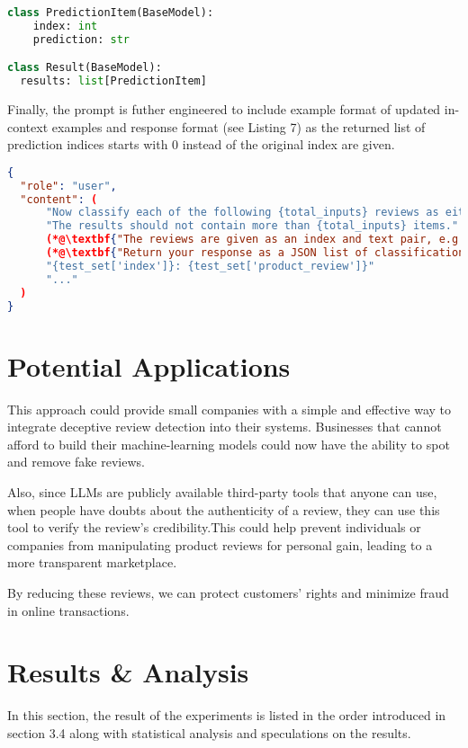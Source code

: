 \documentclass[sigconf, nonacm]{acmart}
\theoremstyle{definition}
\begin{document}
\begin{lstlisting}[language=Python, caption={Final Response Format}]
class PredictionItem(BaseModel):
    index: int
    prediction: str

class Result(BaseModel):
  results: list[PredictionItem]
\end{lstlisting}

Finally, the prompt is futher engineered to include example format of updated in-context examples and response format (see Listing 7) as the returned list of prediction indices starts with 0 instead of the original index are given.

\begin{lstlisting}[language=json, caption={Final User Messages}]
{
  "role": "user",
  "content": (
      "Now classify each of the following {total_inputs} reviews as either 'truthful' or 'deceptive'. "
      "The results should not contain more than {total_inputs} items."
      (*@\textbf{"The reviews are given as an index and text pair, e.g. '123: This is a review.'"}@*)
      (*@\textbf{"Return your response as a JSON list of classifications paired with an index, e.g. [{'123': 'truthful'}, {'456': 'deceptive'}, ...]."}@*)
      "{test_set['index']}: {test_set['product_review']}"
      "..."
  )
}
\end{lstlisting}

\section{Potential Applications}

This approach could provide small companies with a simple and effective way to integrate deceptive review detection into their systems. Businesses that cannot afford to build their machine-learning models could now have the ability to spot and remove fake reviews.

Also, since LLMs are publicly available third-party tools that anyone can use, when people have doubts about the authenticity of a review, they can use this tool to verify the review's credibility.This could help prevent individuals or companies from manipulating product reviews for personal gain, leading to a more transparent marketplace.

By reducing these reviews, we can protect customers' rights and minimize fraud in online transactions.

\section{Results \& Analysis}
In this section, the result of the experiments is listed in the order introduced in section 3.4 along with statistical analysis and speculations on the results.
\end{document}
